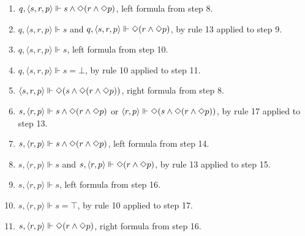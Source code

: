 \begin{myEx}
\begin{enumerate}
\item $q, \langle s,r,p \rangle \Vdash s \land \Diamond(r \land \Diamond p)$, left formula from step 8.\\ %

\item $q, \langle s,r,p \rangle \Vdash s$ and $q, \langle s,r,p \rangle \Vdash \Diamond(r \land \Diamond p)$, by rule 13 applied to step 9.\\ %

\item $q, \langle s,r,p \rangle \Vdash s$, left formula from step 10.\\ %

\item $q, \langle s,r,p \rangle \Vdash s = \bot$, by rule 10 applied to step 11.\\ %

\item $\langle s,r,p \rangle \Vdash \Diamond(s \land \Diamond(r \land \Diamond p))$, right formula from step 8.\\ %

\item $s, \langle r,p \rangle \Vdash s \land \Diamond(r \land \Diamond p)$ or $\langle r,p \rangle \Vdash \Diamond(s \land \Diamond(r \land \Diamond p))$, by rule 17 applied to step 13.\\ %

\item $s, \langle r,p \rangle \Vdash s \land \Diamond(r \land \Diamond p)$, left formula from step 14.\\ %

\item $s, \langle r,p \rangle \Vdash s$ and $s, \langle r,p \rangle \Vdash \Diamond(r \land \Diamond p)$, by rule 13 applied to step 15.\\ %

\item $s, \langle r,p \rangle \Vdash s$, left formula from step 16.\\ %

\item $s, \langle r,p \rangle \Vdash s = \top$, by rule 10 applied to step 17.\\ %

\item $s, \langle r,p \rangle \Vdash \Diamond(r \land \Diamond p)$, right formula from step 16.\\ %


\end{enumerate}
\end{myEx}
